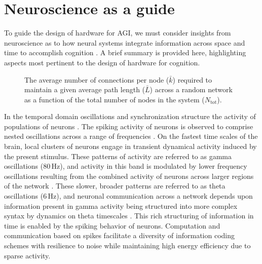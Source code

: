 \documentclass[twocolumn]{article}
\begin{document}
\section{\label{sec:neuroscience}Neuroscience as a guide}
To guide the design of hardware for AGI, we must consider insights from neuroscience as to how neural systems integrate information across space and time to accomplish cognition \cite{bu2006,sp2010,beba2017,khma2018}. A brief summary is provided here, highlighting aspects most pertinent to the design of hardware for cognition. 

\begin{figure}[t]
	\caption{\label{fig:path_length}The average number of connections per node ($\bar{k}$) required to maintain a given average path length ($\bar{L}$)  across a random network as a function of the total number of nodes in the system ($N_{\mathrm{tot}}$).}
\end{figure}
In the temporal domain oscillations and synchronization structure the activity of populations of neurons \cite{bu2006}. The spiking activity of neurons is observed to comprise nested oscillations across a range of frequencies \cite{budr2004}. On the fastest time scales of the brain, local clusters of neurons engage in transient dynamical activity induced by the present stimulus. These patterns of activity are referred to as gamma oscillations (80\,Hz), and activity in this band is modulated by lower frequency oscillations \cite{caed2006,jeco2007} resulting from the combined activity of neurons across larger regions of the network \cite{stsa2000}. These slower, broader patterns are referred to as theta oscillations (6\,Hz), and neuronal communication across a network depends upon information present in gamma activity being structured into more complex syntax by dynamics on theta timescales \cite{fr2015,bu2019}. This rich structuring of information in time is enabled by the spiking behavior of neurons. Computation and communication based on spikes facilitate a diversity of information coding schemes with resilience to noise while maintaining high energy efficiency due to sparse activity.
\end{document}
